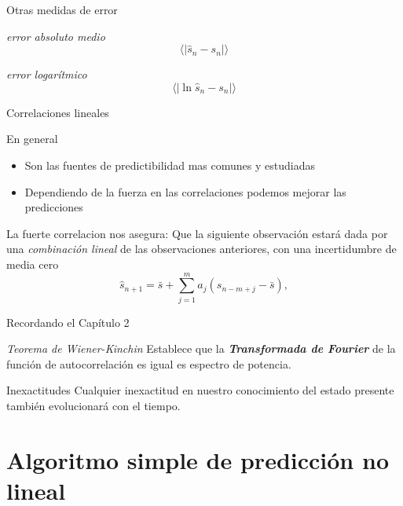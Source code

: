 \documentclass[11pt]{beamer}
\begin{document}
\begin{frame}{Otras medidas de error}
\begin{block}{\textit{error absoluto medio}}
\begin{equation}
\langle |\hat{s}_n - s_n| \rangle
\end{equation}
\end{block}
\begin{block}{\textit{error logarítmico}}
\begin{equation}
\langle |\ln \hat{s}_n - s_n| \rangle
\end{equation}
\end{block}
\end{frame}

\begin{frame}{Correlaciones lineales}
\begin{block}{En general}
\begin{itemize}
\item Son las fuentes de predictibilidad mas comunes y estudiadas
\item Dependiendo de la fuerza en las correlaciones podemos mejorar las predicciones
\end{itemize}
\end{block}
\begin{block}{La fuerte correlacion nos asegura:}
\small
Que la siguiente observación estará dada por una \textit{combinación lineal} de las observaciones anteriores, con una incertidumbre de media cero
\begin{equation}
\hat{s}_{n+1} = \bar{s} + \sum_{j=1}^{m} a_j (s_{n-m+j} - \bar{s}), 
\end{equation}
\end{block}
\end{frame}

\begin{frame}{Recordando el Capítulo 2}
\begin{block}{\textit{Teorema de Wiener-Kinchin}}
Establece que la \textbf{\textit{Transformada de Fourier}} de la función de autocorrelación es igual es espectro de potencia.
\end{block}
\begin{block}{Inexactitudes}
Cualquier inexactitud en nuestro conocimiento del estado presente también evolucionará con el tiempo.
\end{block}
\end{frame}

\section{Algoritmo simple de predicción no lineal}
\begin{frame} 
\tableofcontents[currentsection] %
\end{frame}
\end{document}

